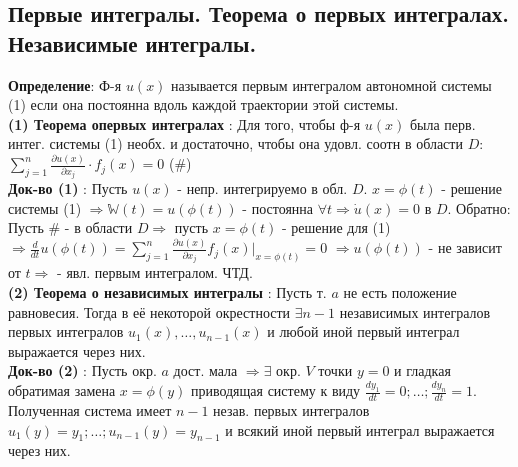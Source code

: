 \documentclass[unicode, 10pt, a4paper,oneside, landscape]{article}
\begin{document}
\begin{multicols}{4}
\subsection{Первые интегралы. Теорема о первых интегралах. Независимые интегралы.}
{\bf Определение}: Ф-я $u(x)$ называется первым интегралом автономной системы (1) если она постоянна вдоль каждой траектории этой системы.\\
{\bf (1) Теорема опервых интегралах} : Для того, чтобы ф-я $u(x)$ была перв. интег. системы (1) необх. и достаточно, чтобы она удовл. соотн в области $D$: $\sum_{j=1}^n \frac{\partial u(x)}{\partial x_j}\cdot f_j(x) = 0$ (\#)\\
{\bf Док-во (1)} : Пусть $u(x)$ - непр. интегрируемо в обл. $D$. $x = \phi(t)$ - решение системы (1) $\Rightarrow \mathbb{W}(t) = u(\phi(t))$ - постоянна $\forall t \Rightarrow \dot{u}(x) = 0$ в $D$. Обратно: Пусть \# - в области $D \Rightarrow$ пусть $x = \phi(t)$ - решение для (1) $\Rightarrow \frac{d}{dt}u(\phi(t)) = \sum_{j=1}^n \frac{\partial u(x)}{\partial x_j}f_j(x)|_{x = \phi(t)} = 0$ $\Rightarrow u(\phi(t))$ - не зависит от $t \Rightarrow$ - явл. первым интегралом. ЧТД.\\
{\bf (2) Теорема о независимых интегралы} : Пусть т. $a$ не есть положение равновесия. Тогда в её некоторой окрестности $\exists n-1$ независимых интегралов первых интегралов $u_1(x), \ldots, u_{n-1}(x)$ и любой иной первый интеграл выражается через них.\\
{\bf Док-во (2)} : Пусть окр. $a$ дост. мала $\Rightarrow \exists$ окр. $V$ точки $y=0$ и гладкая обратимая замена $x = \phi(y)$ приводящая систему к виду $\frac{dy_1}{dt} = 0; \ldots; \frac{dy_n}{dt} = 1$. Полученная система имеет $n-1$ незав. первых интегралов $u_1(y) = y_1; \ldots; u_{n-1}(y) = y_{n-1}$ и всякий иной первый интеграл выражается через них. 





\end{multicols}	
\end{document}
